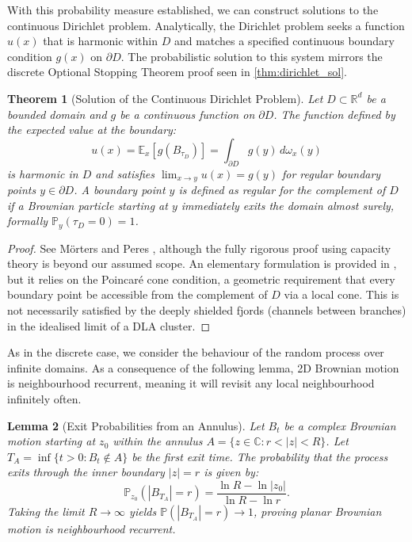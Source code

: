 \documentclass[12pt, a4paper, oneside]{report}
\newtheorem{theorem}{Theorem}[chapter]
\newtheorem{lemma}[theorem]{Lemma}
\theoremstyle{remark}
\begin{document}
With this probability measure established, we can construct solutions to the continuous Dirichlet problem. Analytically, the Dirichlet problem seeks a function $u(x)$ that is harmonic within $D$ and matches a specified continuous boundary condition $g(x)$ on $\partial D$. The probabilistic solution to this system mirrors the discrete Optional Stopping Theorem proof seen in \cref{thm:dirichlet_sol}.

\begin{theorem}[Solution of the Continuous Dirichlet Problem]
    \label{the:dirichlet_solution}
Let $D \subset \mathbb{R}^d$ be a bounded domain and $g$ be a continuous function on $\partial D$. The function defined by the expected value at the boundary:
\begin{equation*}
    u(x) = \mathbb{E}_x[g(B_{\tau_D})] = \int_{\partial D} g(y) \, d\omega_x(y)
\end{equation*}
is harmonic in $D$ and satisfies $\lim_{x \to y} u(x) = g(y)$ for regular boundary points $y \in \partial D$. A boundary point $y$ is defined as regular for the complement of $D$ if a Brownian particle starting at $y$ immediately exits the domain almost surely, formally $\mathbb{P}_y(\tau_D = 0) = 1$.
\end{theorem}

\begin{proof}
See M{\"o}rters and Peres \cite[Theorem 8.5(b)]{Morters2010}, although the fully rigorous proof using capacity theory is beyond our assumed scope. An elementary formulation is provided in \cite[Theorem 3.12]{Morters2010}, but it relies on the Poincar\'e cone condition, a geometric requirement that every boundary point be accessible from the complement of $D$ via a local cone. This is not necessarily satisfied by the deeply shielded fjords (channels between branches) in the idealised limit of a DLA cluster.
\end{proof}

As in the discrete case, we consider the behaviour of the random process over infinite domains. As a consequence of the following lemma, 2D Brownian motion is neighbourhood recurrent, meaning it will revisit any local neighbourhood infinitely often.

\begin{lemma}[Exit Probabilities from an Annulus]
Let $B_t$ be a complex Brownian motion starting at $z_0$ within the annulus $A = \{z \in \mathbb{C} : r < |z| < R\}$. Let $T_A = \inf\{t > 0 : B_t \notin A\}$ be the first exit time. The probability that the process exits through the inner boundary $|z|=r$ is given by:
\begin{equation*}
    \mathbb{P}_{z_0}(|B_{T_A}| = r) = \frac{\ln R - \ln |z_0|}{\ln R - \ln r}.
\end{equation*}
Taking the limit $R \to \infty$ yields $\mathbb{P}(|B_{T_A}| = r) \to 1$, proving planar Brownian motion is neighbourhood recurrent.
\end{lemma}
\end{document}
